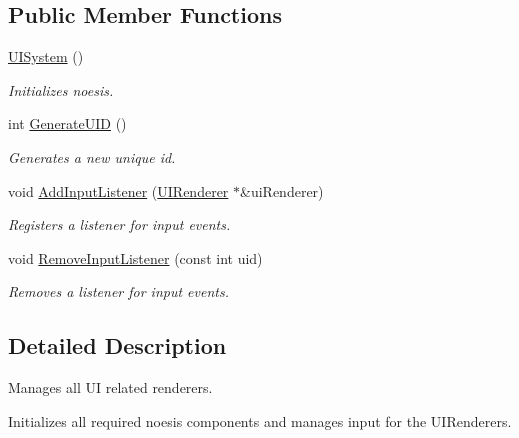 \subsection*{Public Member Functions}
\begin{DoxyCompactItemize}
\item 
\hypertarget{class_u_i_system_ac930744c42c305f09deacd176045392b}{\hyperlink{class_u_i_system_ac930744c42c305f09deacd176045392b}{U\-I\-System} ()}\label{class_u_i_system_ac930744c42c305f09deacd176045392b}

\begin{DoxyCompactList}\small\item\em Initializes noesis. \end{DoxyCompactList}\item 
int \hyperlink{class_u_i_system_a5735f001450f7ecd82a4de76558640c6}{Generate\-U\-I\-D} ()
\begin{DoxyCompactList}\small\item\em Generates a new unique id. \end{DoxyCompactList}\item 
void \hyperlink{class_u_i_system_abed897e2720483f469cc1d986259ef9b}{Add\-Input\-Listener} (\hyperlink{class_u_i_renderer}{U\-I\-Renderer} $\ast$\&ui\-Renderer)
\begin{DoxyCompactList}\small\item\em Registers a listener for input events. \end{DoxyCompactList}\item 
void \hyperlink{class_u_i_system_a74283b6b5d8fb8170e6bae1e6e690255}{Remove\-Input\-Listener} (const int uid)
\begin{DoxyCompactList}\small\item\em Removes a listener for input events. \end{DoxyCompactList}\end{DoxyCompactItemize}


\subsection{Detailed Description}
Manages all U\-I related renderers. 

Initializes all required noesis components and manages input for the U\-I\-Renderers. 

